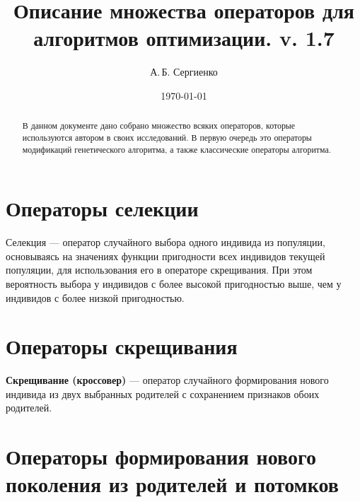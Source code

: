 \documentclass[a4paper,12pt]{article}
\title{Описание множества операторов для алгоритмов оптимизации. v. 1.7}
\author{А.\,Б. Сергиенко}
\date{\today}
\begin{document}


\maketitle

\begin{abstract}
В данном документе дано собрано множество всяких операторов, которые используются автором в своих исследований. В первую очередь это операторы модификаций генетического алгоритма, а также классические операторы алгоритма.
\end{abstract}

\tableofcontents

\newpage




\section{Операторы селекции}\label{SetOfOperatorsAlgorithms:section_selection}

Селекция --- оператор случайного выбора одного индивида из популяции, основываясь на значениях функции пригодности всех индивидов текущей популяции, для использования его в операторе скрещивания. При этом вероятность выбора у индивидов с более высокой пригодностью выше, чем у индивидов с более низкой пригодностью.






\section{Операторы скрещивания}\label{SetOfOperatorsAlgorithms:section_Crossover}

\textbf{Скрещивание (кроссовер)} --- оператор случайного формирования нового индивида из двух выбранных родителей с сохранением признаков обоих родителей.
















\section{Операторы формирования нового поколения из родителей и потомков}\label{SetOfOperatorsAlgorithms:section_forming}
\end{document}

